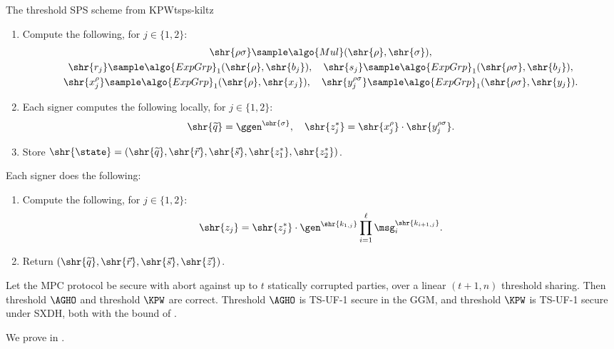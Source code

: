 \begin{protocolbox}{The threshold SPS scheme from KPW}{tsps-kiltz}
\begin{description}
\begin{enumerate}
	\item Compute the following, for $j \in \{1, 2\}$:
	  \begin{gather*}
	    \shr{\rho\sigma} \sample \algo{Mul}(\shr{\rho}, \shr{\sigma}), \\
	    \shr{r_j} \sample \algo{ExpGrp}_1(\shr{\rho}, \shr{b_j}), \quad
\shr{s_j} \sample \algo{ExpGrp}_1(\shr{\rho\sigma}, \shr{b_j}), \\
	    \shr{x_j^{\rho}} \sample \algo{ExpGrp}_1(\shr{\rho}, \shr{x_j}), \quad
\shr{y_j^{\rho\sigma}} \sample \algo{ExpGrp}_1(\shr{\rho\sigma}, \shr{y_j}).
	  \end{gather*}

	\item Each signer computes the following locally, for $j \in \{1, 2\}$:
	  \begin{equation*}
	    \shr{\widetilde{q}} = \ggen^{\shr{\sigma}}, \quad \shr{z^*_j} =
\shr{x_j^{\rho}} \cdot \shr{y_j^{\rho\sigma}}.
	  \end{equation*}

	\item Store $\shr{\state} = (\shr{\widetilde{q}}, \shr{\vec{r}},
\shr{\vec{s}}, \shr{z^*_1}, \shr{z^*_2})$.

      \end{enumerate}

    \item[$\SPSsig_h \leftarrow \TSPSonsign(\sk_h, \state_h, \vec{\msg})$ :]
Each signer does the following:

      \begin{enumerate}

	\item Compute the following, for $j \in \{1, 2\}$:
	  \begin{equation*}
	    \shr{z_j} = \shr{z^*_j} \cdot \gen^{\shr{k_{1,j}}} \prod_{i=1}^{\ell}
\msg_i^{\shr{k_{i+1,j}}}.
	  \end{equation*}

	\item Return $(\shr{\widetilde{q}}, \shr{\vec{r}}, \shr{\vec{s}},
\shr{\vec{z}})$.

      \end{enumerate}

  \end{description}

\end{protocolbox}

\begin{theorem}\label{thm:tsps-security} Let the MPC protocol be secure with
abort against up to $t$ statically corrupted parties, over a linear $(t+1, n)$
threshold sharing. Then threshold $\AGHO$ and threshold $\KPW$ are correct.
Threshold $\AGHO$ is TS-UF-1 secure in the GGM, and threshold $\KPW$ is TS-UF-1
secure under SXDH, both with the bound of
.\end{theorem}

We prove  in .

